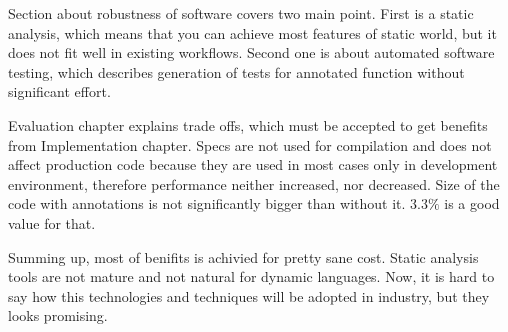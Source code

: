 Section about robustness of software covers two main point. First is a static
analysis, which means that you can achieve most features of static world, but it
does not fit well in existing workflows. Second one is about automated software
testing, which describes generation of tests for annotated function without
significant effort.

Evaluation chapter explains trade offs, which must be accepted to get benefits
from Implementation chapter. Specs are not used for compilation and does not
affect production code because they are used in most cases only in development
environment, therefore performance neither increased, nor decreased. Size of the
code with annotations is not significantly bigger than without it. $3.3\%$ is a
good value for that.

Summing up, most of benifits is achivied for pretty sane cost. Static analysis
tools are not mature and not natural for dynamic languages. Now, it is hard to
say how this technologies and techniques will be adopted in industry, but they
looks promising.
